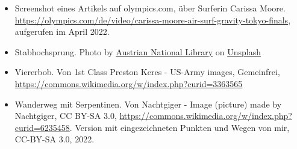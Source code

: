\documentclass{beamer}
\begin{document}
\begin{frame}
\begin{tiny}
\begin{itemize}
\item
Screenshot eines Artikels auf olympics.com, über Surferin Carissa Moore. \href{https://olympics.com/de/video/carissa-moore-air-surf-gravity-tokyo-finals}{https://olympics.com/de/video/carissa-moore-air-surf-gravity-tokyo-finals}, aufgerufen im April 2022.

\item
Stabhochsprung. Photo by \href{https://unsplash.com/@austriannationallibrary?utm_source=unsplash&utm_medium=referral&utm_content=creditCopyText}{Austrian National Library} on \href{https://unsplash.com/s/photos/pole-vault?utm_source=unsplash&utm_medium=referral&utm_content=creditCopyText}{Unsplash}

\item
Viererbob. Von 1st Class Preston Keres - US-Army images, Gemeinfrei, \url{https://commons.wikimedia.org/w/index.php?curid=3363565}

\item
  
Wanderweg mit Serpentinen. Von Nachtgiger - Image (picture) made by Nachtgiger, CC BY-SA 3.0, \url{https://commons.wikimedia.org/w/index.php?curid=6235458}. Version mit eingezeichneten Punkten und Wegen von mir, CC-BY-SA 3.0, 2022.

\end{itemize}
\end{tiny}
\end{frame}
\end{document}
